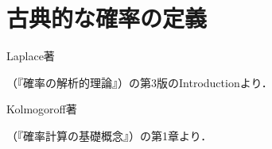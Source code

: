 \documentclass[main.tex]{subfiles}
\begin{document}
\chapter{古典的な確率の定義}

\begin{glossbox}
Laplace著\begin{french}\end{french}（『確率の解析的理論』）の第3版のIntroductionより．

\bigskip


\end{glossbox}

\begin{glossbox}
Kolmogoroff著\begin{german}\end{german}（『確率計算の基礎概念』）の第1章より．

\end{glossbox}
\end{document}

